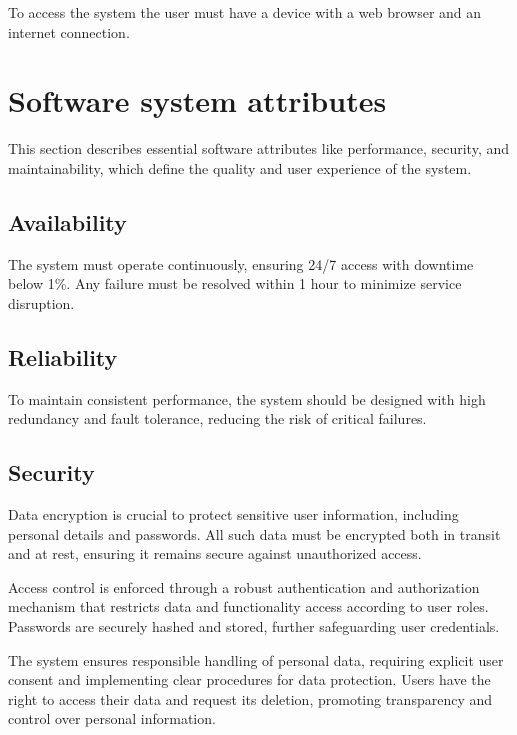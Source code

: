 To access the system the user must have a device with a web browser and an internet connection.


\section{Software system attributes}

This section describes essential software attributes like performance, security, and maintainability, which define the quality and user experience of the system.

\subsection{Availability}

The system must operate continuously, ensuring 24/7 access with downtime below 1\%.
Any failure must be resolved within 1 hour to minimize service disruption.

\subsection{Reliability}

To maintain consistent performance, the system should be designed with high redundancy and fault tolerance, reducing the risk of critical failures.

\subsection{Security}

Data encryption is crucial to protect sensitive user information, including personal details and passwords.
All such data must be encrypted both in transit and at rest, ensuring it remains secure against unauthorized access.

Access control is enforced through a robust authentication and authorization mechanism that restricts data and functionality access according to user roles.
Passwords are securely hashed and stored, further safeguarding user credentials.

The system ensures responsible handling of personal data, requiring explicit user consent and implementing clear procedures for data protection.
Users have the right to access their data and request its deletion, promoting transparency and control over personal information.

